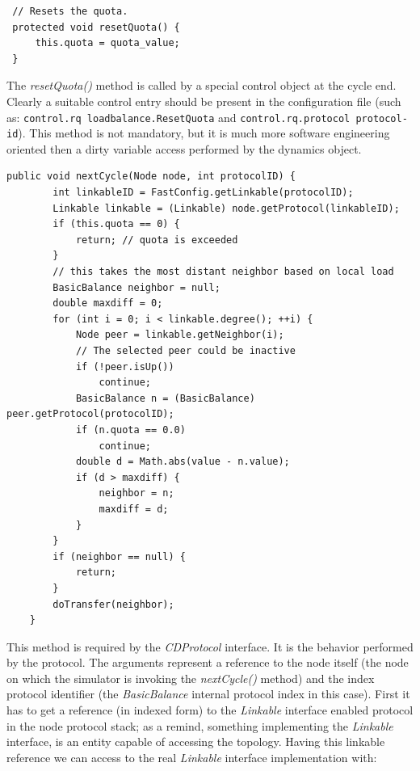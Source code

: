 \documentclass[a4paper,11pt]{article}
\begin{document}
\footnotesize
\begin{verbatim}
 // Resets the quota. 
 protected void resetQuota() {
     this.quota = quota_value;
 }
\end{verbatim}
\normalsize

The \emph{resetQuota()} method is called by a special control object at
the cycle end. Clearly a suitable control entry should be present
in the configuration file (such as: \texttt{control.rq loadbalance.ResetQuota}
and \texttt{control.rq.protocol protocol-id}). This method is not
mandatory, but it is much more software engineering oriented then a
dirty variable access performed by the dynamics object.

\footnotesize
\begin{verbatim}
public void nextCycle(Node node, int protocolID) {
        int linkableID = FastConfig.getLinkable(protocolID);
        Linkable linkable = (Linkable) node.getProtocol(linkableID);
        if (this.quota == 0) {
            return; // quota is exceeded
        }
        // this takes the most distant neighbor based on local load
        BasicBalance neighbor = null;
        double maxdiff = 0;
        for (int i = 0; i < linkable.degree(); ++i) {
            Node peer = linkable.getNeighbor(i);
            // The selected peer could be inactive
            if (!peer.isUp())
                continue;
            BasicBalance n = (BasicBalance) peer.getProtocol(protocolID);
            if (n.quota == 0.0)
                continue;
            double d = Math.abs(value - n.value);
            if (d > maxdiff) {
                neighbor = n;
                maxdiff = d;
            }
        }
        if (neighbor == null) {
            return;
        }
        doTransfer(neighbor);
    }
\end{verbatim}
\normalsize

This method is required by the \emph{CDProtocol} interface. It is the
behavior performed by the protocol. The arguments represent a reference
to the node itself (the node on which the simulator is invoking the
\emph{nextCycle()} method) and the index protocol identifier (the
\emph{BasicBalance} 
internal protocol index in this case). First it has to get a reference
(in indexed form) to 
the \emph{Linkable} interface enabled protocol in the node protocol
stack; as a remind, something implementing the \emph{Linkable} interface,
is an entity capable of accessing the topology. Having this linkable
reference we can access to the real \emph{Linkable} interface
implementation with: 
\end{document}
